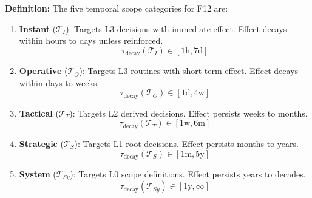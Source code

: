 \begin{tcolorbox}[colback=gray!5!white, colframe=gray!75!black,
    title=Definition HHH-D2: Temporal Scope Categories]

\textbf{Definition:} The five temporal scope categories for F12 are:

\begin{enumerate}[nosep]
    \item \textbf{Instant} ($\mathcal{T}_I$): Targets L3 decisions with immediate effect. Effect decays within hours to days unless reinforced.
    \begin{equation}
    \tau_{\text{decay}}(\mathcal{T}_I) \in [1\text{h}, 7\text{d}]
    \end{equation}

    \item \textbf{Operative} ($\mathcal{T}_O$): Targets L3 routines with short-term effect. Effect decays within days to weeks.
    \begin{equation}
    \tau_{\text{decay}}(\mathcal{T}_O) \in [1\text{d}, 4\text{w}]
    \end{equation}

    \item \textbf{Tactical} ($\mathcal{T}_T$): Targets L2 derived decisions. Effect persists weeks to months.
    \begin{equation}
    \tau_{\text{decay}}(\mathcal{T}_T) \in [1\text{w}, 6\text{m}]
    \end{equation}

    \item \textbf{Strategic} ($\mathcal{T}_S$): Targets L1 root decisions. Effect persists months to years.
    \begin{equation}
    \tau_{\text{decay}}(\mathcal{T}_S) \in [1\text{m}, 5\text{y}]
    \end{equation}

    \item \textbf{System} ($\mathcal{T}_{Sy}$): Targets L0 scope definitions. Effect persists years to decades.
    \begin{equation}
    \tau_{\text{decay}}(\mathcal{T}_{Sy}) \in [1\text{y}, \infty]
    \end{equation}
\end{enumerate}

\end{tcolorbox}

